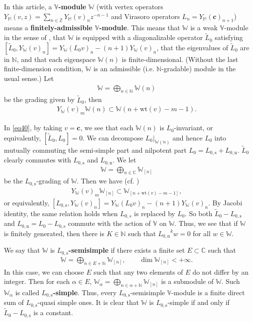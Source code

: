 \documentclass[12pt,a4paper,notitlepage]{article}
\theoremstyle{definition}
\theoremstyle{plain}
\newcommand{\wtd}{\widetilde}
\newcommand{\Vbb}{\mathbb V}
\newcommand{\Wbb}{\mathbb W}
\newcommand{\Mbb}{\mathbb M}
\newcommand{\Cbb}{\mathbb C}
\newcommand{\Nbb}{\mathbb N}
\newcommand{\Zbb}{\mathbb Z}
\newcommand{\cbf}{\mathbf c}
\newcommand{\wt}{\mathrm{wt}}
\newcommand{\Lss}{L_{0,\mathrm{s}}}
\newcommand{\Lni}{{L_{0,\mathrm{n}}}}
\numberwithin{equation}{section}
\begin{document}
In this article,  a \textbf{$\Vbb$-module} $\Wbb$ (with vertex operators $Y_\Mbb(v,z)=\sum_{n\in\Zbb}Y_\Mbb(v)_nz^{-n-1}$ and Virasoro operators $L_n=Y_\Mbb(\cbf)_{n+1}$) means a \textbf{finitely-admissible $\Vbb$-module}. This means that $\Wbb$ is a weak $\Vbb$-module in the sense of \cite{DLM97}, that $\Wbb$ is equipped with a diagonalizable operator $\wtd L_0$ satisfying $[\wtd L_0,Y_\Wbb(v)_n]=Y_\Wbb(L_0 v)_n-(n+1)Y_\Wbb(v)_n$, \index{L0@$\wtd L_0$}  that the eigenvalues of $\wtd L_0$ are in $\Nbb$, and that each eigenspace $\Wbb(n)$ is finite-dimensional. (Without the last finite-dimension condition, $\Wbb$ is an admissible (i.e. $\Nbb$-gradable) module in the usual sense.) Let \index{W@$\Wbb(n),\Wbb_{(n)}$}
\begin{align*}
\Wbb=\bigoplus_{n\in\Nbb}\Wbb(n)	
\end{align*}
be the grading given by $\wtd L_0$, then \begin{align}
Y_\Wbb(v)_m\Wbb(n)\subset \Wbb(n+\wt(v)-m-1).\label{eq40}
\end{align}

In \eqref{eq40}, by taking $v=\cbf$, we see that  each $\Wbb(n)$ is $L_0$-invariant, or equivalently, $[\wtd L_0,L_0]=0$. We can decompose $L_0|_{\Wbb(n)}$ and hence $L_0$ into mutually commuting the semi-simple part and nilpotent part $L_0=\Lss+\Lni$.  \index{L0@$\Lss,\Lni$}  $\wtd L_0$ clearly commutes with $\Lss$ and $\Lni$. We let
\begin{align*}
\Wbb=\bigoplus_{n\in\Cbb}\Wbb_{[n]}	
\end{align*}
be the $\Lss$-grading of $\Wbb$. Then we have (cf. \cite[Prop. 2.19]{HLZ14})
\begin{align}
	Y_\Wbb(v)_m\Wbb_{[n]}\subset \Wbb_{[n+\wt(v)-m-1]},
\end{align}
or equivalently, $[\Lss,Y_\Wbb(v)_n]=Y_\Wbb(L_0 v)_n-(n+1)Y_\Wbb(v)_n$. By Jacobi identity, the same relation holds when $L_{0,s}$ is replaced by $L_0$. So both $\wtd L_0-\Lss$ and $\Lni=L_0-\Lss$ commute with the action of $\Vbb$ on $\Wbb$. Thus, we see that if $\Wbb$ is finitely generated, then there is $K\in\Nbb$ such that $\Lni^kw=0$ for all $w\in\Wbb$.

We say that $\Wbb$ is \textbf{$\Lss$-semisimple} if there exists a finite set $E\subset\Cbb$ such that 
\begin{align*}
\Wbb=\bigoplus_{n\in E+\Nbb}\Wbb_{[n]},\qquad \dim\Wbb_{[n]}<+\infty.
\end{align*}
In this case, we can choose $E$ such that any two elements of $E$ do not differ by an integer. Then for each $\alpha\in E$, $\Wbb_\alpha=\bigoplus_{n\in\alpha+\Nbb}\Wbb_{[n]}$ is a submodule of $\Wbb$. Such $\Wbb_\alpha$ is called \textbf{$\Lss$-simple}. Thus, every $\Lss$-semisimple $\Vbb$-module is a finite direct sum of $\Lss$-quasi simple ones. It is clear that $\Wbb$ is $\Lss$-simple if and only if  $\wtd L_0-\Lss$ is a constant.
\end{document}
